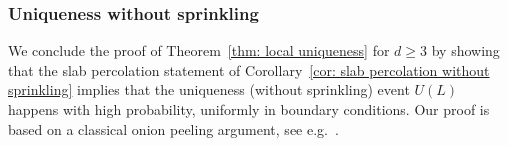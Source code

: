 \documentclass[11pt,a4paper]{article}
\theoremstyle{definition}
\numberwithin{equation}{section}
\begin{document}


\subsubsection{Uniqueness without sprinkling}

We conclude the proof of Theorem~\ref{thm: local uniqueness} for $d\geq3$ by showing that the slab percolation statement of Corollary~\ref{cor: slab percolation without sprinkling} implies that the uniqueness (without sprinkling) event $U(L)$ happens with high probability, uniformly in boundary conditions. Our proof is based on a classical onion peeling argument, see e.g.~\cite[Lemma 7.89]{GrimmettPercolation1999}.
\end{document}
